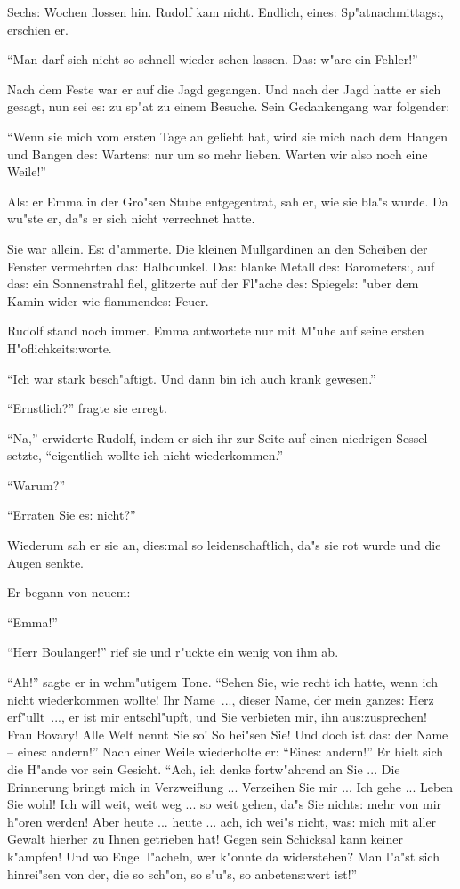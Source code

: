 \documentclass[oneside,12pt]{book}
\newcommand{\s}{s:}%
\begin{document}
Sech{\s} Wochen flossen hin. Rudolf kam nicht. Endlich, eine{\s}
Sp"atnachmittag{\s}, erschien er.

"`Man darf sich nicht so schnell wieder sehen lassen. Da{\s} w"are
ein Fehler!"'

Nach dem Feste war er auf die Jagd gegangen. Und nach der Jagd
hatte er sich gesagt, nun sei e{\s} zu sp"at zu einem Besuche.
Sein Gedankengang war folgender:

"`Wenn sie mich vom ersten Tage an geliebt hat, wird sie mich nach
dem Hangen und Bangen de{\s} Warten{\s} nur um so mehr lieben.
Warten wir also noch eine Weile!"'

Al{\s} er Emma in der Gro"sen Stube entgegentrat, sah er, wie sie
bla"s wurde. Da wu"ste er, da"s er sich nicht verrechnet hatte.

Sie war allein. E{\s} d"ammerte. Die kleinen Mullgardinen an den
Scheiben der Fenster vermehrten da{\s} Halbdunkel. Da{\s} blanke
Metall de{\s} Barometer{\s}, auf da{\s} ein Sonnenstrahl fiel,
glitzerte auf der Fl"ache de{\s} Spiegel{\s} "uber dem Kamin wider
wie flammende{\s} Feuer.

Rudolf stand noch immer. Emma antwortete nur mit M"uhe auf seine
ersten H"oflichkeit{\s}worte.

"`Ich war stark besch"aftigt. Und dann bin ich auch krank
gewesen."'

"`Ernstlich?"' fragte sie erregt.

"`Na,"' erwiderte Rudolf, indem er sich ihr zur Seite auf einen
niedrigen Sessel setzte, "`eigentlich wollte ich nicht
wiederkommen."'

"`Warum?"'

"`Erraten Sie e{\s} nicht?"'

Wiederum sah er sie an, die{\s}mal so leidenschaftlich, da"s sie
rot wurde und die Augen senkte.

Er begann von neuem:

"`Emma!"'

"`Herr Boulanger!"' rief sie und r"uckte ein wenig von ihm ab.

"`Ah!"' sagte er in wehm"utigem Tone. "`Sehen Sie, wie recht ich
hatte, wenn ich nicht wiederkommen wollte! Ihr Name~..., dieser
Name, der mein ganze{\s} Herz erf"ullt~..., er ist mir
entschl"upft, und Sie verbieten mir, ihn au{\s}zusprechen! Frau
Bovary! Alle Welt nennt Sie so! So hei"sen Sie! Und doch ist
da{\s} der Name -- eine{\s} andern!"' Nach einer Weile wiederholte
er: "`Eine{\s} andern!"' Er hielt sich die H"ande vor sein
Gesicht. "`Ach, ich denke fortw"ahrend an Sie ... Die Erinnerung
bringt mich in Verzweiflung ... Verzeihen Sie mir ... Ich gehe ...
Leben Sie wohl! Ich will weit, weit weg ... so weit gehen, da"s
Sie nicht{\s} mehr von mir h"oren werden! Aber heute ... heute ...
ach, ich wei"s nicht, wa{\s} mich mit aller Gewalt hierher zu
Ihnen getrieben hat! Gegen sein Schicksal kann keiner k"ampfen!
Und wo Engel l"acheln, wer k"onnte da widerstehen? Man l"a"st sich
hinrei"sen von der, die so sch"on, so s"u"s, so anbeten{\s}wert
ist!"'
\end{document}
